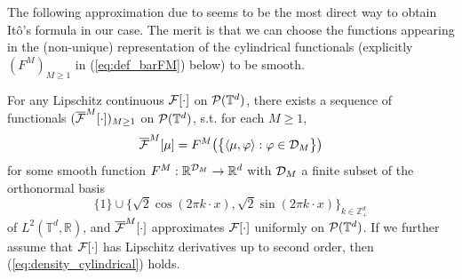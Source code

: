 The following approximation due to \cite{CD22} seems to be the most direct way to obtain It\^o's formula in our case. The merit is that we can choose the functions appearing in the (non-unique) representation of the cylindrical functionals (explicitly $(F^M)_{M \geq 1}$ in (\ref{eq:def_barFM}) below) to be smooth. 

\begin{prop}\label{lem:density_cylindrical2} For any Lipschitz continuous $\mathcal{F}[\cdot]$ on $\mathcal{P}(\mathbb{T}^d)$, there exists a sequence of functionals $(\overline{\mathcal{F}}^M[\cdot])_{M \geq 1}$ on $\mathcal{P}(\mathbb{T}^d)$, s.t. for each $M \geq 1$,
\begin{equation}\label{eq:def_barFM}
\overline{\mathcal{F}}^M[\mu] = F^M\big(\big\{\langle \mu, \varphi \rangle: \varphi \in \mathcal{D}_M\big\}\big)
\end{equation}
for some smooth function $F^M: \mathbb{R}^{ \mathcal{D}_M} \to \mathbb{R}^d$ with $ \mathcal{D}_M$ a finite subset of the orthonormal basis 
\[
\{1\} \cup \Big\{\sqrt{2}\cos(2\pi k \cdot x), \sqrt{2}\sin(2\pi k \cdot x)\Big\}_{k \in \mathbb{Z}^d_+}
\]
of $L^2(\mathbb{T}^d, \mathbb{R})$, and $\overline{\mathcal{F}}^M[\cdot]$ approximates $\mathcal{F}[\cdot]$ uniformly on $\mathcal{P}(\mathbb{T}^d)$. If we further assume that $\mathcal{F}[\cdot]$ has Lipschitz derivatives up to second order, then (\ref{eq:density_cylindrical}) holds.
\end{prop}

